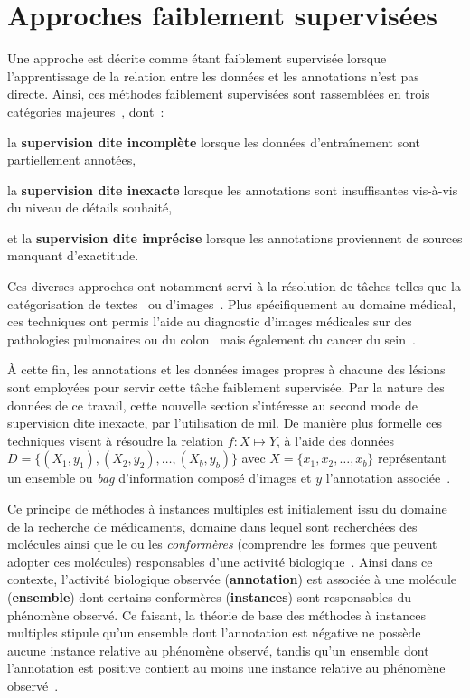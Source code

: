 \section{Approches faiblement supervisées}
\label{sec:patient_decision_weak}
Une approche est décrite comme étant faiblement supervisée lorsque l'apprentissage de la relation entre les données et les annotations n'est pas directe. Ainsi, ces méthodes faiblement supervisées sont rassemblées en trois catégories majeures~\cite{Zhou2018}, dont~:
\begin{inlinerate}
    \item la \textbf{supervision dite incomplète} lorsque les données d'entraînement sont partiellement annotées,
    \item la \textbf{supervision dite inexacte} lorsque les annotations sont insuffisantes vis-à-vis du niveau de détails souhaité,
    \item et la \textbf{supervision dite imprécise} lorsque les annotations proviennent de sources manquant d'exactitude.
\end{inlinerate} Ces diverses approches ont notamment servi à la résolution de tâches telles que la catégorisation de textes~\cite{Andrews2003,Settles2008} ou d'images~\cite{Chen2004,Tang2009}. Plus spécifiquement au domaine médical, ces techniques ont permis l'aide au diagnostic d'images médicales sur des pathologies pulmonaires ou du colon~\cite{Dundar2007} mais également du cancer du sein~\cite{Sudharshan2019}.\par

À cette fin, les annotations et les données images propres à chacune des lésions sont employées pour servir cette tâche faiblement supervisée. Par la nature des données de ce travail, cette nouvelle section s'intéresse au second mode de supervision dite inexacte, par l'utilisation de \gls{mil}. De manière plus formelle ces techniques visent à résoudre la relation $f: X \mapsto Y$, à l'aide des données $D=\{(X_1,y_1),(X_2,y_2),\ldots,(X_b,y_b)\}$ avec $X=\{x_1,x_2,\ldots,x_b\}$ représentant un ensemble ou \textit{bag} d'information composé d'images et $y$ l'annotation associée~\cite{foulds2010}.\par

Ce principe de méthodes à instances multiples est initialement issu du domaine de la recherche de médicaments, domaine dans lequel sont recherchées des molécules ainsi que le ou les \textit{conformères} (comprendre les formes que peuvent adopter ces molécules) responsables d'une activité biologique~\cite{Dietterich1997}. Ainsi dans ce contexte, l'activité biologique observée (\textbf{annotation}) est associée à une molécule (\textbf{ensemble}) dont certains conformères (\textbf{instances}) sont responsables du phénomène observé. Ce faisant, la théorie de base des méthodes à instances multiples stipule qu'un ensemble dont l'annotation est négative ne possède aucune instance relative au phénomène observé, tandis qu'un ensemble dont l'annotation est positive contient au moins une instance relative au phénomène observé~\cite{Dietterich1997}.\par

